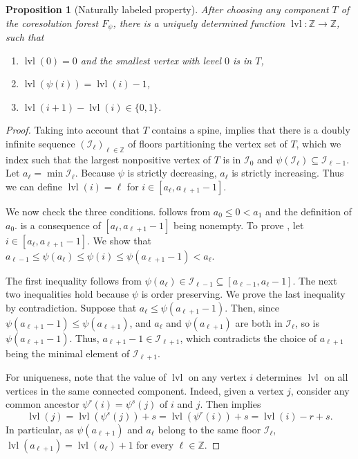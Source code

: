 \documentclass[a4paper]{amsart}
\newtheorem{proposition}[theorem]{Proposition}
\theoremstyle{definition}
\theoremstyle{remark}
\numberwithin{equation}{theorem}
\newcommand{\Z}{\mathbb{Z}}
\newcommand{\level}{\operatorname{lvl}}
\newcommand{\psiforest}{F_\psi}
\begin{document}
\begin{proposition}[Naturally labeled property]\label{thm:naturally}
  After choosing any component $T$ of the coresolution forest
  $\psiforest$, there is a uniquely determined function
  $\level:\mathbb Z\to\mathbb Z$, such that
  \begin{enumerate}
  \item\label{init} $\level(0)=0$ and the smallest vertex with level $0$ is in
    $T$,
  \item\label{parent} $\level(\psi(i)) = \level(i)-1$,
  \item\label{monotone} $\level(i+1)-\level(i)\in\{0,1\}$.
  \end{enumerate}
\end{proposition}
\begin{proof}
  Taking into account that $T$ contains a spine, 
  implies that there is a doubly infinite sequence
  $(\mathcal I_\ell)_{\ell\in\Z}$ of floors partitioning the vertex
  set of $T$, which we index such that the largest nonpositive
  vertex of $T$ is in $\mathcal I_0$ and
  $\psi(\mathcal I_\ell)\subseteq \mathcal I_{\ell-1}$.  Let
  $a_\ell = \min\mathcal I_\ell$.  Because $\psi$ is strictly
  decreasing, $a_\ell$ is strictly increasing.  Thus we can define
  $\level(i) = \ell$ for $i\in[a_\ell, a_{\ell+1}-1]$.

  We now check the three conditions.   follows from
  $a_0\leq 0<a_1$ and the definition of $a_0$.   is a
  consequence of $[a_\ell, a_{\ell+1}-1]$ being nonempty.  To prove
  , let $i\in [a_\ell, a_{\ell+1}-1]$.  We show that
  $a_{\ell-1}\leq\psi(a_\ell)\leq\psi(i)\leq\psi(a_{\ell+1}-1)<
  a_\ell$.

  The first inequality follows from
  $\psi(a_\ell)\in\mathcal I_{\ell-1}\subseteq [a_{\ell-1},
  a_\ell-1]$.  The next two inequalities hold because $\psi$ is order
  preserving.  We prove the last inequality by contradiction.
  Suppose that $a_\ell\leq\psi(a_{\ell+1}-1)$.  Then, since
  $\psi(a_{\ell+1}-1)\leq\psi(a_{\ell+1})$, and $a_\ell$ and
  $\psi(a_{\ell+1})$ are both in $\mathcal I_\ell$, so is
  $\psi(a_{\ell+1}-1)$.  Thus, $a_{\ell+1}-1\in\mathcal I_{\ell+1}$,
  which contradicts the choice of $a_{\ell+1}$ being the minimal
  element of $\mathcal I_{\ell+1}$.

  For uniqueness, note that the value of $\level$ on any vertex $i$
  determines $\level$ on all vertices in the same connected
  component.  Indeed, given a vertex $j$, consider any common
  ancestor $\psi^r(i) = \psi^s(j)$ of $i$ and $j$.  Then
   implies
  \[
    \level(j) = \level(\psi^s(j)) + s %
    = \level(\psi^r(i)) + s = \level(i) - r + s.
  \]
  In particular, as $ \psi ( a_{\ell+1} ) $ and $ a_\ell $ belong to the same floor $ \mathcal I_\ell $, $ \level( a_{ \ell+1 } ) = \level( a_\ell ) + 1 $ for every $ \ell \in \Z $.


\end{proof}
\end{document}

